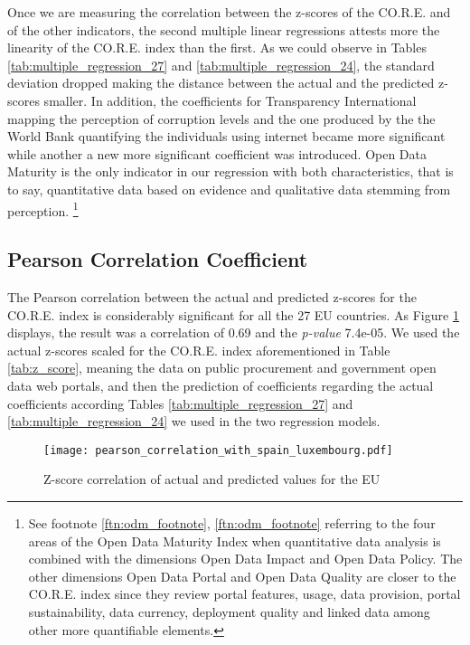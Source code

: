 \documentclass[a4paper, twoside]{report}
\let\oldfootnote\footnote
\renewcommand\footnote[1]{%
\oldfootnote{\hspace{2mm}#1}}
\begin{document}
Once we are measuring the correlation between the z-scores of the CO.R.E. and of the other indicators, the second multiple linear regressions attests more the linearity of the CO.R.E. index than the first. As we could observe in Tables \ref{tab:multiple_regression_27} and \ref{tab:multiple_regression_24}, the standard deviation dropped making the distance between the actual and the predicted z-scores smaller. In addition, the coefficients for Transparency International mapping the perception of corruption levels and the one produced by the the World Bank quantifying the individuals using internet became more significant while another a new more significant coefficient was introduced. Open Data Maturity is the only indicator in our regression with both characteristics, that is to say, quantitative data based on evidence and qualitative data stemming from perception.\footnote{See footnote \ref{ftn:odm_footnote}, \cref{ftn:odm_footnote} referring to the four areas of the Open Data Maturity Index when quantitative data analysis is combined with the dimensions Open Data Impact and Open Data Policy. The other dimensions Open Data Portal and Open Data Quality are closer to the CO.R.E. index since they review portal features, usage, data provision, portal sustainability, data currency, deployment quality and linked data among other more quantifiable elements.}\\

\subsection{Pearson Correlation Coefficient}
\label{pearson_correlation_chapter}

The Pearson correlation between the actual and predicted z-scores for the CO.R.E. index is considerably significant for all the 27 EU countries. As Figure \ref{fig:pearson_correlation_with_spain_luxembourg} displays, the result was a correlation of 0.69 and the \textit{p-value} 7.4e-05. We used the actual z-scores scaled for the CO.R.E. index aforementioned in Table \ref{tab:z_score}, meaning the data on public procurement and government open data web portals, and then the prediction of coefficients regarding the actual coefficients according Tables \ref{tab:multiple_regression_27} and \ref{tab:multiple_regression_24} we used in the two regression models.\\ 

\begin{figure}[H]
\centering
	\caption{Z-score correlation of actual and predicted values for the EU}
	\texttt{[image: pearson\_correlation\_with\_spain\_luxembourg.pdf]}
	\label{fig:pearson_correlation_with_spain_luxembourg}
\end{figure}
\end{document}
